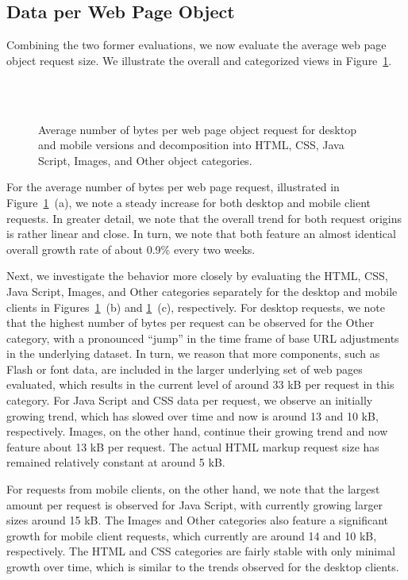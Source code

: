 \documentclass[onecolumn,12pt]{IEEEtran}
\begin{document}
\subsection{Data per Web Page Object}
Combining the two former evaluations, we now evaluate the average web page object request size.
We illustrate the overall and categorized views in Figure~\ref{fig:relative}.
\begin{figure}
	\centering
	\\
	\qquad
	\\
	\caption{Average number of bytes per web page object request for desktop and mobile versions and decomposition into  HTML, CSS, Java Script, Images, and Other object categories.\label{fig:relative}}
\end{figure}
For the average number of bytes per web page request, illustrated in Figure~\ref{fig:relative}~(a), we note a steady increase for both desktop and mobile client requests. 
In greater detail, we note that the overall trend for both request origins is rather linear and close.
In turn, we note that both feature an almost identical overall growth rate of about 0.9\% every two weeks.

Next, we investigate the behavior more closely by evaluating the HTML, CSS, Java Script, Images, and Other categories separately for the desktop and mobile clients in Figures~\ref{fig:relative}~(b) and \ref{fig:relative}~(c), respectively.
For desktop requests, we note that the highest number of bytes per request can be observed for the Other category, with a pronounced ``jump'' in the time frame of base URL adjustments in the underlying dataset. 
In turn, we reason that more components, such as Flash or font data, are included in the larger underlying set of web pages evaluated, which results in the current level of around 33 kB per request in this category.
For Java Script and CSS data per request, we observe an initially growing trend, which has slowed over time and now is around 13 and 10 kB, respectively.
Images, on the other hand, continue their growing trend and now feature about 13 kB per request.
The actual HTML markup request size has remained relatively constant at around 5 kB.

For requests from mobile clients, on the other hand, we note that the largest amount per request is observed for Java Script, with currently growing larger sizes around 15 kB.
The Images and Other categories also feature a significant growth for mobile client requests, which currently are around 14 and 10 kB, respectively.
The HTML and CSS categories are fairly stable with only minimal growth over time, which is similar to the trends observed for the desktop clients.
\end{document}
